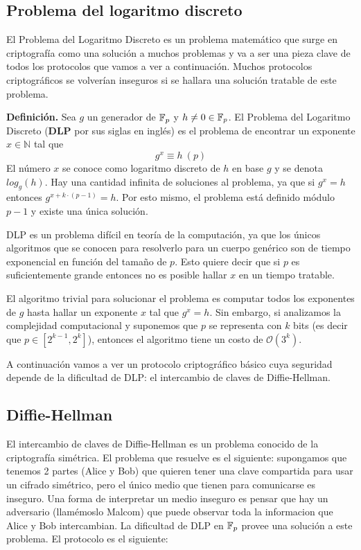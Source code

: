 \subsection{Problema del logaritmo discreto} \label{sec:logaritmo_discreto}
El Problema del Logaritmo Discreto es un problema matemático que surge en criptografía como una solución a muchos problemas y va a ser una pieza clave de todos los protocolos que vamos a ver a continuación. Muchos protocolos criptográficos se volverían inseguros si se hallara una solución tratable de este problema. 

\vspace{1em}

\textbf{Definición.} Sea $g$ un generador de $\mathbb{F}_p$ y $h \neq 0 \in \mathbb{F}_p$. El Problema del Logaritmo Discreto (\textbf{DLP} por sus siglas en inglés) es el problema de encontrar un exponente $x \in \mathbb{N}$ tal que $$g^x \equiv h ~ (p)$$ El número $x$ se conoce como logaritmo discreto de $h$ en base $g$ y se denota $log_g(h)$. Hay una cantidad infinita de soluciones al problema, ya que si $g^x = h$ entonces $g^{x+k\cdot(p-1)} = h$. Por esto mismo, el problema está definido módulo $p-1$ y existe una única solución. 

DLP es un problema difícil en teoría de la computación, ya que los únicos algoritmos que se conocen para resolverlo para un cuerpo genérico son de tiempo exponencial en función del tamaño de $p$. Esto quiere decir que si $p$ es suficientemente grande entonces no es posible hallar $x$ en un tiempo tratable.

El algoritmo trivial para solucionar el problema es computar todos los exponentes de $g$ hasta hallar un exponente $x$ tal que $g^x = h$. Sin embargo, si analizamos la complejidad computacional y suponemos que $p$ se representa con $k$ bits (es decir que $p \in [2^{k-1}, 2^k]$), entonces el algoritmo tiene un costo de $\mathcal{O}(3^k)$.

A continuación vamos a ver un protocolo criptográfico básico cuya seguridad depende de la dificultad de DLP: el intercambio de claves de Diffie-Hellman.

\subsection{Diffie-Hellman}
El intercambio de claves de Diffie-Hellman es un problema conocido de la criptografía simétrica. El problema que resuelve es el siguiente: supongamos que tenemos 2 partes (Alice y Bob) que quieren tener una clave compartida para usar un cifrado simétrico, pero el único medio que tienen para comunicarse es inseguro. Una forma de interpretar un medio inseguro es pensar que hay un adversario (llamémoslo Malcom) que puede observar toda la informacion que Alice y Bob intercambian. La dificultad de DLP en $\mathbb{F}_p$ provee una solución a este problema. El protocolo es el siguiente:

